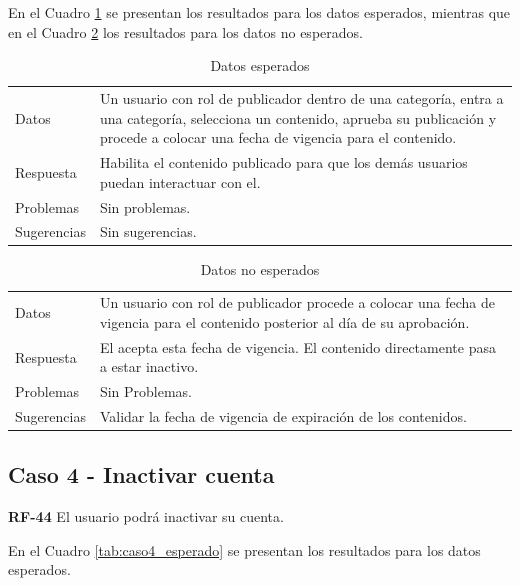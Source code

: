 \documentclass[10pt,times,twocolumn]{article}
\begin{document}
En el Cuadro \ref{tab:caso3_esperado} se presentan los resultados para los datos esperados, mientras que en el Cuadro \ref{tab:caso3_no_esperado} los resultados para los datos no esperados.

\begin{table}[H]
    \centering
    \begin{tabular}{p{3cm}p{4cm}}
        \rowcolor{gray!15}
        Datos & Un usuario con rol de publicador dentro de una categoría,  entra a una categoría, selecciona un contenido, aprueba su publicación y procede a colocar una fecha de vigencia para el contenido.\\
       	Respuesta & Habilita el contenido publicado para que los demás usuarios puedan interactuar con el.\\
       	Problemas & Sin problemas.\\
       	Sugerencias & Sin sugerencias.\\
    \end{tabular}
    \caption{Datos esperados}
    \label{tab:caso3_esperado}
\end{table}

\begin{table}[H]
    \centering
    \begin{tabular}{p{3cm}p{4cm}}
        \rowcolor{gray!15}
        Datos & Un usuario con rol de publicador procede a colocar una fecha de vigencia para el contenido posterior al día de su aprobación.\\
        Respuesta & El acepta esta fecha de vigencia. El contenido directamente pasa a estar inactivo.\\
       	Problemas & Sin Problemas.\\
       	Sugerencias & Validar la fecha de vigencia de expiración de los contenidos.\\
    \end{tabular}
    \caption{Datos no esperados}
    \label{tab:caso3_no_esperado}
\end{table}

\subsection{Caso 4 - Inactivar cuenta}

\textbf{RF-44} El usuario podrá inactivar su cuenta.

En el Cuadro \ref{tab:caso4_esperado} se presentan los resultados para los datos esperados.
\end{document}
